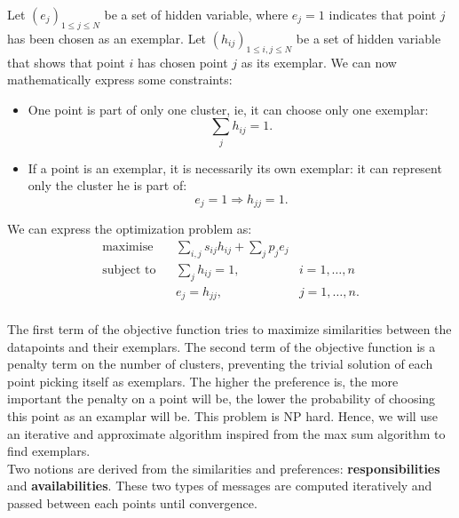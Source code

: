 \documentclass{ipol}
\begin{document}
Let $(e_j)_{1 \leq j \leq N}$ be a set of hidden variable, where $e_j = 1$
indicates that point $j$ has been chosen as an exemplar. Let $(h_{ij})_{1 \leq
i, j \leq N}$ be a set of hidden variable that shows that point $i$ has chosen
point $j$ as its exemplar. We can now mathematically express some constraints:

\begin{itemize}
\item One point is part of only one cluster, ie, it can choose only one
exemplar:
\begin{equation*}
\sum_{j} h_{ij} = 1.
\end{equation*}
\item If a point is an exemplar, it is necessarily its own exemplar: it can
represent only the cluster he is part of:
\begin{equation*}
e_{j} = 1 \Rightarrow h_{jj} = 1.
\end{equation*}
\end{itemize}

We can express the optimization problem as:
\begin{equation*}
\renewcommand{\arraystretch}{2}
\begin{array}{ccll}
\text{maximise} & & \sum_{i, j} s_{ij} h_{ij} + \sum_{j} p_j e_j & \\
\text{subject to} &  & \sum_{j} h_{ij} = 1, & i = 1, \dots, n \\
		  &  & e_{j} = h_{jj}, & j = 1, \dots, n.\\
\end{array}
\end{equation*}


The first term of the objective function tries to maximize similarities
between the datapoints and their exemplars. The second term of the objective
function is a penalty term on the number of clusters, preventing the trivial
solution of each point picking itself as exemplars. The higher the preference
is, the more important the penalty on a point will be, the lower the
probability of choosing this point as an examplar will be. This problem is NP
hard. Hence, we will use an iterative and approximate algorithm inspired from
the max sum algorithm to find exemplars. \\

Two notions are derived from the similarities and preferences:
\textbf{responsibilities} and \textbf{availabilities}. These two types of
messages are computed iteratively and passed between each points until
convergence. \\
\end{document}
